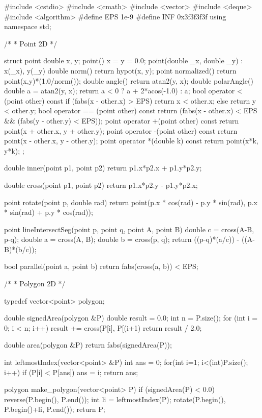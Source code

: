 \documentclass[11pt]{article}
\begin{document}
\begingroup\scriptsize
\begin{vncode}
#include <cstdio>
#include <cmath>
#include <vector>
#include <deque>
#include <algorithm>
#define EPS 1e-9
#define INF 0x3f3f3f3f
using namespace std;

/*
 * Point 2D
 */

struct point {
	double x, y;
	point() { x = y = 0.0; }
	point(double _x, double _y) : x(_x), y(_y) {}
	double norm() {
		return hypot(x, y);
	}
	point normalized() {
		return point(x,y)*(1.0/norm());
	}
	double angle() { return atan2(y, x); }
	double polarAngle() {
		double a = atan2(y, x);
		return a < 0 ? a + 2*acos(-1.0) : a;
	}
	bool operator < (point other) const {
		if (fabs(x - other.x) > EPS) return x < other.x;
		else return y < other.y;
	}
	bool operator == (point other) const {
		return (fabs(x - other.x) < EPS && (fabs(y - other.y) < EPS));
	}
	point operator +(point other) const {
		return point(x + other.x, y + other.y);
	}
	point operator -(point other) const {
		return point(x - other.x, y - other.y);
	}
	point operator *(double k) const {
		return point(x*k, y*k);
	}
};

double inner(point p1, point p2) {
	return p1.x*p2.x + p1.y*p2.y;
}

double cross(point p1, point p2) {
	return p1.x*p2.y - p1.y*p2.x;
}

point rotate(point p, double rad) {
	return point(p.x * cos(rad) - p.y * sin(rad),
	p.x * sin(rad) + p.y * cos(rad));
}

point lineIntersectSeg(point p, point q, point A, point B) {
	double c = cross(A-B, p-q);
	double a = cross(A, B);
	double b = cross(p, q);
	return ((p-q)*(a/c)) - ((A-B)*(b/c));
}

bool parallel(point a, point b) {
	return fabs(cross(a, b)) < EPS;
}

/*
 * Polygon 2D
 */

typedef vector<point> polygon;

double signedArea(polygon &P) {
	double result = 0.0;
	int n = P.size();
	for (int i = 0; i < n; i++) {
		result += cross(P[i], P[(i+1)%
	}
	return result / 2.0;
}

double area(polygon &P) {
	return fabs(signedArea(P));
}

int leftmostIndex(vector<point> &P) {
	int ans = 0;
	for(int i=1; i<(int)P.size(); i++) {
		if (P[i] < P[ans]) ans = i;
	}
	return ans;
}

polygon make_polygon(vector<point> P) {
	if (signedArea(P) < 0.0) reverse(P.begin(), P.end());
	int li = leftmostIndex(P);
	rotate(P.begin(), P.begin()+li, P.end());
	return P;
}


\end{vncode}
\end{document}
